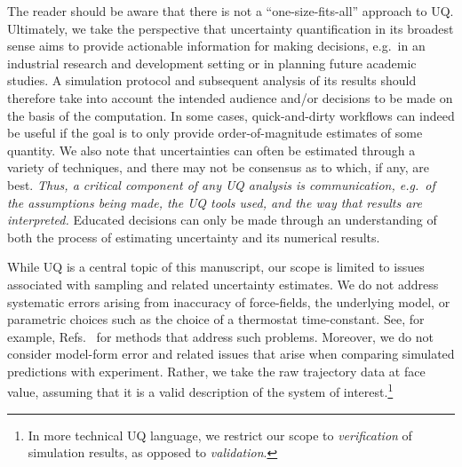 The reader should be aware that there is not a ``one-size-fits-all'' approach to UQ.  Ultimately, we take the perspective that uncertainty quantification in its broadest sense aims to provide actionable information for making decisions, e.g.\ in an industrial research and development setting or in planning future academic studies.  A simulation protocol and subsequent analysis of its results should therefore take into account the intended audience and/or decisions to be made on the basis of the computation.  In some cases, quick-and-dirty workflows can indeed be useful if the goal is to only provide order-of-magnitude estimates of some quantity.  We also note that uncertainties can often be estimated through a variety of techniques, and there may not be consensus as to which, if any, are best.  {\it Thus, a critical component of any UQ analysis is communication, e.g.\ of the assumptions being made, the UQ tools used, and the way that results are interpreted.}  Educated decisions can only be made through an understanding of both the process of estimating uncertainty and its numerical results.

While UQ is a central topic of this manuscript, our scope is limited to issues associated with sampling and related uncertainty estimates.  We do not address systematic errors arising from inaccuracy of force-fields, the underlying model, or parametric choices such as the choice of a thermostat time-constant.  See, for example, Refs.~\cite{Leimkuhler,Rizzi2,Rizzi3,Rizzi4} for methods that address such problems.  Moreover, we do not consider model-form error and related issues that arise when comparing simulated predictions with experiment.  Rather, we take the raw trajectory data at face value, assuming that it is a valid description of the system of interest.\footnote{In more technical UQ language, we restrict our scope to {\it verification} of simulation results, as opposed to {\it validation}.}

